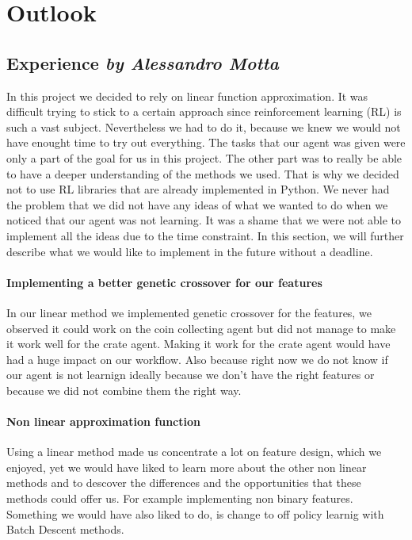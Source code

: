 \chapter{Outlook}

\section[Experience]{Experience \hfill \small \normalfont\textit{by Alessandro Motta}}
In this project we decided to rely on linear function approximation. It was difficult trying to stick to a certain approach since reinforcement learning (RL) is such a vast subject. Nevertheless we had to do it, because we knew we would not have enought time to try out everything. The tasks that our agent was given were only a part of the goal for us in this project. The other part was to really be able to have a deeper understanding of the methods we used. That is why we decided not to use RL libraries that are already implemented in Python. We never had the problem that we did not have any ideas of what we wanted to do when we noticed that our agent was not learning. It was a shame that we were not able to implement all the ideas due to the time constraint. In this section, we will further describe what we would like to implement in the future without a deadline.
\subsubsection*{Implementing a better genetic crossover for our features}
In our linear method we implemented genetic crossover for the features, we observed it could work on the coin collecting agent but did not manage to make it work well for the crate agent. Making it work for the crate agent would have had a huge impact on our workflow. Also because right now we do not know if our agent is not learnign ideally because we don't have the right features or because we did not combine them the right way. 
\subsubsection*{Non linear approximation function}
Using a linear method made us concentrate a lot on feature design, which we enjoyed, yet we would have liked to learn more about the other non linear methods and to descover the differences and the opportunities that these methods could offer us. For example implementing non binary features. Something we would have also liked to do, is change to off policy learnig with Batch Descent methods.
